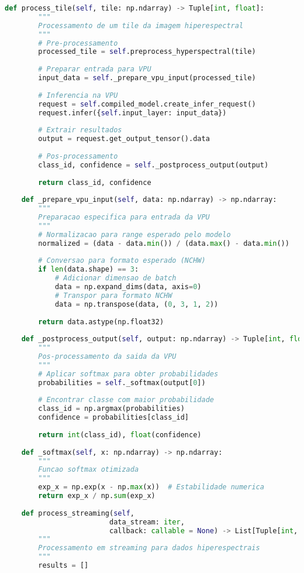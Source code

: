 \begin{lstlisting}[language=Python]
    def process_tile(self, tile: np.ndarray) -> Tuple[int, float]:
        """
        Processamento de um tile da imagem hiperespectral
        """
        # Pre-processamento
        processed_tile = self.preprocess_hyperspectral(tile)
        
        # Preparar entrada para VPU
        input_data = self._prepare_vpu_input(processed_tile)
        
        # Inferencia na VPU
        request = self.compiled_model.create_infer_request()
        request.infer({self.input_layer: input_data})
        
        # Extrair resultados
        output = request.get_output_tensor().data
        
        # Pos-processamento
        class_id, confidence = self._postprocess_output(output)
        
        return class_id, confidence
    
    def _prepare_vpu_input(self, data: np.ndarray) -> np.ndarray:
        """
        Preparacao especifica para entrada da VPU
        """
        # Normalizacao para range esperado pelo modelo
        normalized = (data - data.min()) / (data.max() - data.min())
        
        # Conversao para formato esperado (NCHW)
        if len(data.shape) == 3:
            # Adicionar dimensao de batch
            data = np.expand_dims(data, axis=0)
            # Transpor para formato NCHW
            data = np.transpose(data, (0, 3, 1, 2))
        
        return data.astype(np.float32)
    
    def _postprocess_output(self, output: np.ndarray) -> Tuple[int, float]:
        """
        Pos-processamento da saida da VPU
        """
        # Aplicar softmax para obter probabilidades
        probabilities = self._softmax(output[0])
        
        # Encontrar classe com maior probabilidade
        class_id = np.argmax(probabilities)
        confidence = probabilities[class_id]
        
        return int(class_id), float(confidence)
    
    def _softmax(self, x: np.ndarray) -> np.ndarray:
        """
        Funcao softmax otimizada
        """
        exp_x = np.exp(x - np.max(x))  # Estabilidade numerica
        return exp_x / np.sum(exp_x)
    
    def process_streaming(self, 
                         data_stream: iter, 
                         callback: callable = None) -> List[Tuple[int, float]]:
        """
        Processamento em streaming para dados hiperespectrais
        """
        results = []
        

\end{lstlisting}
